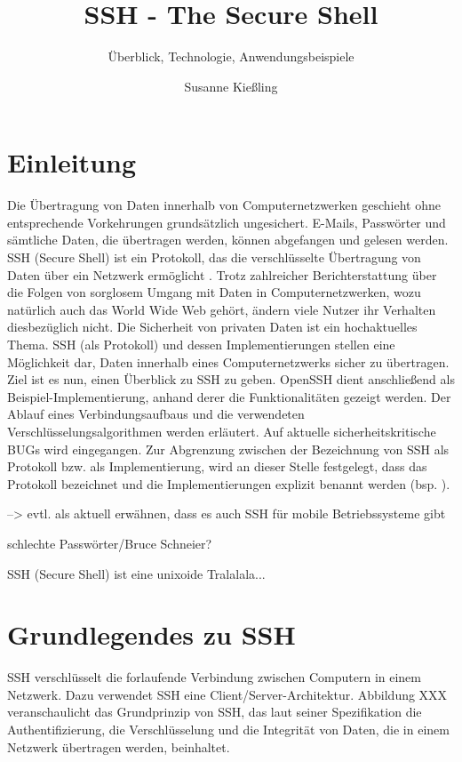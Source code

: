 \documentclass[ngerman,pdf]{wkcms}    %
\title{SSH - The Secure Shell}
\subtitle{Überblick, Technologie, Anwendungsbeispiele}
\author{Susanne Kießling}
\date{\todaylong}
\begin{document}
\maketitle


\section{Einleitung}

Die Übertragung von Daten innerhalb von Computernetzwerken geschieht ohne
entsprechende Vorkehrungen grundsätzlich ungesichert. E-Mails, Passwörter und sämtliche Daten, die übertragen werden, können abgefangen und gelesen werden. SSH (Secure Shell) ist ein Protokoll, das die verschlüsselte Übertragung von Daten über ein Netzwerk ermöglicht \cite{SSH}.
Trotz zahlreicher Berichterstattung über die Folgen von sorglosem Umgang mit Daten in Computernetzwerken, wozu natürlich auch das World Wide Web gehört, ändern viele Nutzer
ihr Verhalten diesbezüglich nicht. Die Sicherheit von privaten Daten ist ein hochaktuelles Thema. SSH (als Protokoll) und dessen Implementierungen stellen eine Möglichkeit dar, Daten innerhalb eines Computernetzwerks sicher zu übertragen. Ziel ist es nun, einen Überblick zu SSH zu geben. OpenSSH dient anschließend als Beispiel-Implementierung, anhand derer die Funktionalitäten gezeigt werden. Der Ablauf eines Verbindungsaufbaus und die verwendeten Verschlüsselungsalgorithmen werden erläutert. Auf aktuelle sicherheitskritische BUGs wird eingegangen. Zur Abgrenzung zwischen der Bezeichnung von SSH als Protokoll bzw. als Implementierung, wird an dieser Stelle festgelegt, dass  das Protokoll bezeichnet und die Implementierungen explizit benannt werden (bsp. ).

--> evtl. als aktuell erwähnen, dass es auch SSH für mobile Betriebssysteme gibt

 schlechte Passwörter/Bruce Schneier?

SSH (Secure Shell) ist eine unixoide \cite{knuthwebsite} Tralalala...



\newpage

\section{Grundlegendes zu SSH}


SSH verschlüsselt die forlaufende Verbindung zwischen Computern in einem Netzwerk. Dazu verwendet SSH eine Client/Server-Architektur. Abbildung XXX veranschaulicht das Grundprinzip von SSH, das laut seiner Spezifikation die Authentifizierung, die Verschlüsselung und die Integrität von Daten, die in einem Netzwerk übertragen werden, beinhaltet.
\end{document}
